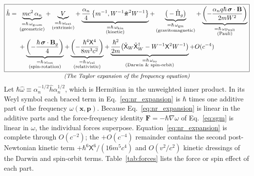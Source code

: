 \documentclass[aps,prd,onecolumn,tightenlines,nofootinbib,notitlepage,11pt,floatfix]{revtex4-2}
\theoremstyle{indentedtheorem}
\begin{document}
\begin{equation}
    \begin{gathered}
    \boxed{\begin{aligned} \hat{h} = {} & \underbrace{mc^2 \, \alpha_n}_{\substack{= \hbar\,\omega_\text{geom} \\ \text{(geometric)}}} + \underbrace{V}_{\substack{= \hbar\,\omega_\text{ext} \\ \text{(extrinsic)}}} + \underbrace{\frac{\alpha_n}{4}\,\big\{m^{-1},W^{-1}\hat{\boldsymbol{\pi}}^2W^{-1}\big\}}_{\substack{= \hbar\,\omega_\text{kin} \\ \text{(kinetic)}}} + \underbrace{\big(-\hat{\Pi}_g\big)}_{\substack{= \hbar\,\omega_\text{gm} \\ \text{(gravitomagnetic)}}} + \underbrace{\left(-\frac{\alpha_nq\hbar\,\boldsymbol{\sigma}\cdot\mathbf{B}}{2mW^2}\right)}_{\substack{= \hbar\,\omega_\text{Pauli} \\ \text{(Pauli)}}} \\ & + \underbrace{\left(-\frac{\hbar\,\boldsymbol{\sigma}\cdot\mathbf{B}_g}{4}\right)}_{\substack{= \hbar\,\omega_\text{rot} \\ \text{(spin-rotation)}}} + \underbrace{\left(-\frac{\hbar^4\mathsf{X}^4}{8m^3c^2}\right)}_{\substack{= \hbar\,\omega_\text{rel} \\ \text{(relativistic)}}} + \underbrace{\frac{\hbar^2}{2m}\big(\tilde{\mathsf{X}}_W\tilde{\mathsf{X}}_W^\dagger-W^{-1}\mathsf{X}^2W^{-1}\big)}_{\substack{= \hbar\,\omega_\text{so} \\ \text{(Darwin \& spin-orbit)}}} + O(c^{-4}) \end{aligned}} \\[-3pt]
    \text{\small\itshape (The Taylor expansion of the frequency equation)}
    \end{gathered}
    \label{eq:nr_expansion}
\end{equation}
Let $\hbar\hat{\omega} \equiv \alpha_n^{-1/2}\hat{h}\alpha_n^{1/2}$, which is Hermitian in the unweighted inner product. In its Weyl symbol each braced term in Eq.~\eqref{eq:nr_expansion} is $\hbar$ times one additive part of the frequency $\omega(\mathbf{x},\mathbf{p})$. Because Eq.~\eqref{eq:nr_expansion} is linear in the additive parts and the force-frequency identity $\mathbf{F}=-\hbar\nabla\omega$ of Eq.~\eqref{eq:sgm} is linear in $\omega$, the individual forces superpose. Equation~\eqref{eq:nr_expansion} is complete through $O(c^{-2})$; the $+O(c^{-4})$ remainder contains the second post-Newtonian kinetic term $+\hbar^6\mathsf{X}^6/(16m^5c^4)$ and $O(v^2/c^2)$ kinetic dressings of the Darwin and spin-orbit terms. Table~\ref{tab:forces} lists the force or spin effect of each part.
\end{document}
